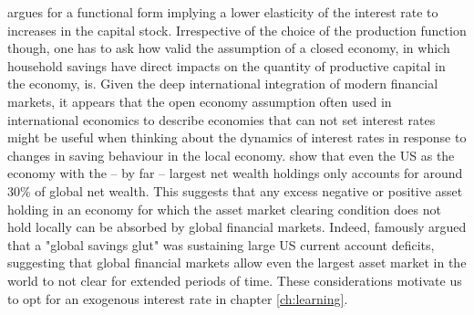 argues for a functional form implying a lower elasticity of the interest rate
to increases in the capital stock. Irrespective of the choice of the production 
function though, one has to ask how valid the assumption of a closed economy, in 
which household savings have direct impacts on the quantity of productive capital
in the economy, is. Given the deep international integration of modern financial
markets, it appears that the open economy assumption often used in international
economics to describe economies that can not set interest rates might be useful
when thinking about the dynamics of interest rates in response to changes in 
saving behaviour in the local economy. \citet{DaviesSandstormShorrocksWolff2007}
show that even the US as the economy with the -- by far -- largest net wealth
holdings only accounts for around 30\% of global net wealth. This suggests that 
any excess negative or positive asset holding in an economy for which the asset
market clearing condition does not hold locally can be absorbed by global financial
markets. Indeed, \citet{Bernanke2005} famously argued that a "global savings
glut" was sustaining large US current account deficits, suggesting that global
financial markets allow even the largest asset market in the world to not clear
for extended periods of time. These considerations motivate us to opt for an
exogenous interest rate in chapter \ref{ch:learning}.

